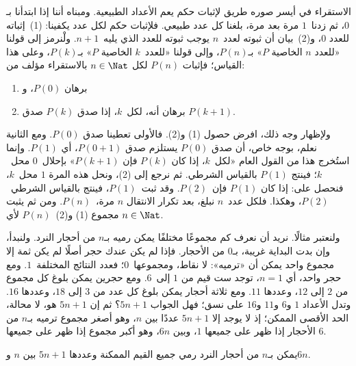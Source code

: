 \documentclass[../../../include/open-logic-section]{subfiles}
\begin{document}


الاستقراء في أيسر صوره طريق لإثبات حكم يعم الأعداد الطبيعية. ومبناه
أننا إذا ابتدأنا بـ$0$، ثم زدنا~$1$ مرة بعد مرة، بلغنا كل عدد طبيعي.
فلإثبات حكم لكل عدد يكفينا: (1)~إثباته للعدد $0$، و(2)~بيان أن ثبوته
لعدد~$n$ يوجب ثبوته للعدد الذي يليه~$n+1$. ولْنرمز إلى قولنا «للعدد
$n$ الخاصية $P$» بـ$P(n)$، وإلى قولنا «للعدد~$k$ الخاصية $P$»
بـ$P(k)$، وعلى هذا القياس؛ فإثبات $P(n)$ لكل $n \in \Nat$
بالاستقراء مؤلف من:
\begin{enumerate}
\item برهان $P(0)$، و
\item برهان أنه، لكل~$k$، إذا صدق $P(k)$ صدق $P(k+1)$.
\end{enumerate}
ولإظهار وجه ذلك، افرض حصول (1) و(2). فالأولى تعطينا صدق $P(0)$.
ومع الثانية نعلم، بوجه خاص، أن صدق $P(0)$ يستلزم صدق $P(0+1)$، أي
$P(1)$. وإنما استُخرج هذا من القول العام «لكل~$k$، إذا كان $P(k)$
فإن $P(k+1)$» بإحلال~$0$ محل~$k$؛ فينتج $P(1)$ بالقياس الشرطي. ثم
نرجع إلى (2)، ونحل هذه المرة $1$ محل~$k$، فنحصل على: إذا كان
$P(1)$ فإن~$P(2)$. وقد ثبت~$P(1)$، فينتج بالقياس الشرطي~$P(2)$،
وهكذا. فلكل عدد~$n$ نبلغ، بعد تكرار الانتقال $n$ مرة،~$P(n)$. ومن ثم
يثبت مجموع (1) و(2)~$P(n)$ لأي $n \in \Nat$.

ولنعتبر مثالًا. نريد أن نعرف كم مجموعًا مختلفًا يمكن رميه بـ$n$ من
أحجار النرد. ولنبدأ، وإن بدت البداية غريبة، بـ$0$ من الأحجار. فإذا لم
يكن عندك حجر أصلًا لم يكن ثمة إلا مجموع واحد يمكن أن «ترميه»: لا نقاط،
ومجموعها~$0$؛ فعدد النتائج المختلفة~$1$. ومع حجر واحد، أي $n=1$،
توجد ست قيم من $1$ إلى~$6$. ومع حجرين يمكن بلوغ كل مجموع من $2$ إلى
$12$، وعددها $11$. ومع ثلاثة أحجار يمكن بلوغ كل عدد من $3$ إلى
$18$، وعددها $16$. وتدل الأعداد $1$ و$6$ و$11$ و$16$ على نسق؛ فهل
الجواب $5n+1$؟ ثم إن $5n+1$ هو، لا محالة، الحد الأقصى الممكن؛ إذ لا
يوجد إلا $5n+1$ عددًا بين $n$، وهو أصغر مجموع ترميه بـ$n$ من الأحجار
إذا ظهر على جميعها $1$، وبين $6n$، وهو أكبر مجموع إذا ظهر على جميعها
$6$.

\begin{thm}
  يمكن بـ$n$ من أحجار النرد رمي جميع القيم الممكنة وعددها $5n+1$ بين
  $n$ و$6n$.
\end{thm}
\end{document}
